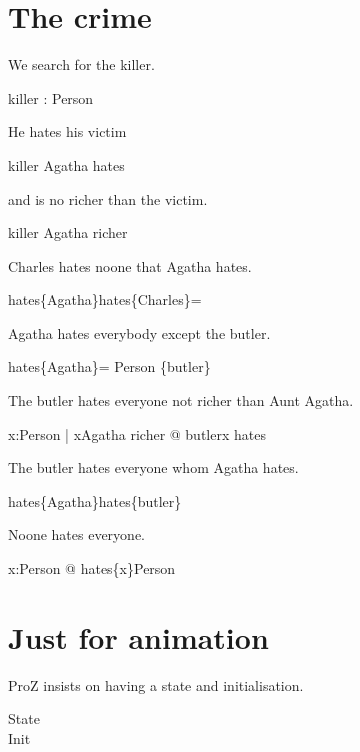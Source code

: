 \documentclass{article}
\begin{document}
\section{The crime}
We search for the killer.
\begin{axdef}
  killer : Person
\end{axdef}
He hates his victim
\begin{zed}
  killer \mapsto Agatha \in hates
\end{zed}
and is no richer than the victim.
\begin{zed}
  killer \mapsto Agatha \notin richer
\end{zed}
Charles hates noone that Agatha hates.
\begin{zed}
  hates\limg\{Agatha\}\rimg \cap hates\limg\{Charles\}\rimg = \emptyset
\end{zed}
Agatha hates everybody except the butler.
\begin{zed}
  hates\limg\{Agatha\}\rimg = Person \setminus \{butler\}
\end{zed}
The butler hates everyone not richer than Aunt Agatha.
\begin{zed}
  \forall x:Person | x\mapsto Agatha \notin richer @ butler\mapsto x \in hates
\end{zed}
The butler hates everyone whom Agatha hates.
\begin{zed}
  hates\limg\{Agatha\}\rimg \subseteq hates\limg\{butler\}\rimg
\end{zed}
Noone hates everyone.
\begin{zed}
  \forall x:Person @ hates\limg\{x\}\rimg \neq Person
\end{zed}

\section{Just for animation}
ProZ insists on having a state and initialisation.
\begin{zed}
  State  \\
  Init \\
\end{zed}
\end{document}
